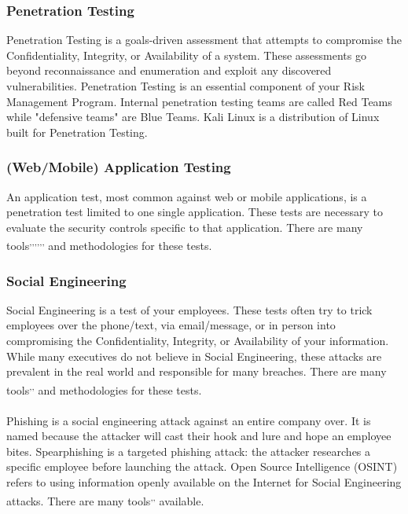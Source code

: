 \subsubsection{Penetration Testing}
Penetration Testing is a goals-driven assessment that attempts to compromise the Confidentiality, Integrity, or Availability of a system. These assessments go beyond reconnaissance and enumeration and exploit any discovered vulnerabilities. Penetration Testing is an essential component of your Risk Management Program. Internal penetration testing teams are called Red Teams while "defensive teams" are Blue Teams. Kali Linux is a distribution of Linux built for Penetration Testing.
\subsubsection{(Web/Mobile) Application Testing}
An application test, most common against web or mobile applications, is a penetration test limited to one single application. These tests are necessary to evaluate the security controls specific to that application. There are many tools\textsuperscript{,}\textsuperscript{,}\textsuperscript{,}\textsuperscript{,}\textsuperscript{,}\textsuperscript{,} and methodologies for these tests.\\
\subsubsection{Social Engineering}
Social Engineering is a test of your employees. These tests often try to trick employees over the phone/text, via email/message, or in person into compromising the Confidentiality, Integrity, or Availability of your information. While many executives do not believe in Social Engineering, these attacks are prevalent in the real world and responsible for many breaches. There are many tools\textsuperscript{,}\textsuperscript{,} and methodologies for these tests.\\\\
Phishing is a social engineering attack against an entire company over. It is named because the attacker will cast their hook and lure and hope an employee bites. Spearphishing is a targeted phishing attack: the attacker researches a specific employee before launching the attack. Open Source Intelligence (OSINT) refers to using information openly available on the Internet for Social Engineering attacks. There are many tools\textsuperscript{,}\textsuperscript{,} available.
